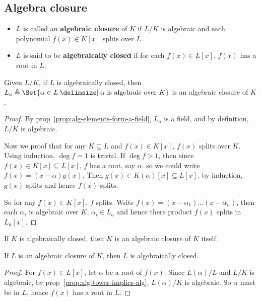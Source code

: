 \subsection{Algebra closure}

\begin{definition} \hfill
  \begin{itemize}
    \item $L$ is called an {\bf algebraic closure} of $K$ if $L/K$ is algebraic and
      each polynomial $f(x) \in K[x]$ splits over $L$.
    \item $L$ is said to be {\bf algebraically closed} if for each $f(x) \in L[x]$,
      $f(x)$ has a root in $L$.
  \end{itemize}
\end{definition}

\begin{prop}
  Given $L/K$, if $L$ is algebraically closed, then $L_a \triangleq
  \Set{\alpha \in L \given \alpha \text{ is algebraic over } K}$ is an
  algebraic closure of $K$.

  \begin{proof}
    By prop~\ref{prop:alg-elements-form-a-field}, $L_a$ is a field, and
    by definition, $L/K$ is algebraic.

    Now we proof that for any $K \subseteq L$ and $f(x) \in K[x]$, $f(x)$
    splits over $K$.  Using induction, $\deg f = 1$ is trivial.
    If $\deg f > 1$, then since $f(x) \in K[x] \subseteq L[x]$,
    $f$ has a root, say $\alpha$. so we could write $f(x) = (x - \alpha) g(x)$.
    Then $g(x) \in K(\alpha)[x] \subseteq L[x]$. by induction, $g(x)$ splits
    and hence $f(x)$ splits.

    So for any $f(x) \in K[x]$, $f$ splits. Write $f(x) = (x - \alpha_1) \dots (x - \alpha_n)$,
    then each $\alpha_i$ is algebraic over $K$, $\alpha_i \in L_a$ and
    hence there product $f(x)$ splits in $L_a[x]$.
  \end{proof}
\end{prop}

\begin{coro}
  If $K$ is algebraically closed, then $K$ is an algebraic closure of $K$ itself.
\end{coro}

\begin{prop}
  If $L$ is an algebraic closure of $K$, then $L$ is algebraically closed.

  \begin{proof}
    For $f(x) \in L[x]$, let $\alpha$ be a root of $f(x)$. Since $L(\alpha)/L$ and
    $L/K$ is algebraic, by prop~\ref{prop:alg-tower-implies-alg}, $L(\alpha)/K$ is algebraic.
    So $\alpha$ must be in $L$, hence $f(x)$ has a root in $L$.
  \end{proof}
\end{prop}

